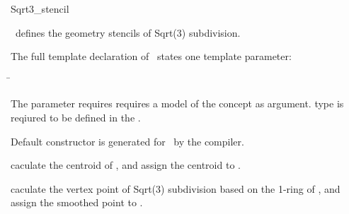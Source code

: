 \begin{ccRefClass}{Sqrt3_stencil}

\ccDefinition

\ccClassTemplateName\ defines the 
geometry stencils of Sqrt(3) subdivision. 


\ccParameters

The full template declaration of \ccClassTemplateName\ states one
template parameter:

\begin{tabbing}
 \=\\
\end{tabbing}
   
The  parameter requires requires a model of 
the  concept as argument.  
type is reqiured to be defined in the .

\ccCreation

Default constructor is generated for \ccClassTemplateName\ by the compiler.

\ccThree{}{}{}

{caculate the centroid of , and assign the centroid 
to .}

{caculate the vertex point of Sqrt(3) subdivision based on the 
1-ring of , and assign the smoothed point to .}


\ccSeeAlso

\\

\end{ccRefClass}

\ccRefPageEnd


